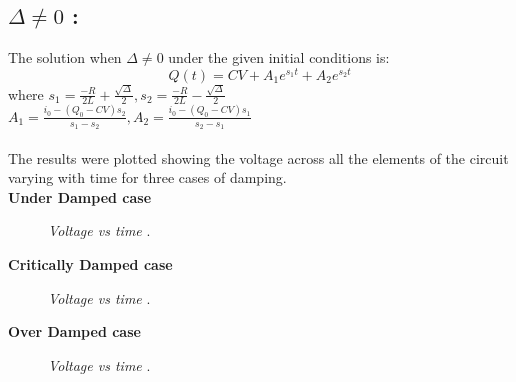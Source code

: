\documentclass[12pt, a4paper]{report}
\begin{document}
\subsection*{$\Delta \ne 0$ :}
The solution when $\Delta \ne 0$ under the given initial conditions is:
\begin{equation}
 Q(t) = CV + A_1e^{s_1t} + A_2e^{s_2t}
\end{equation}
where $s_1 = \frac{-R}{2L} + \frac{\sqrt{\Delta}}{2} , s_2 = \frac{-R}{2L} - \frac{\sqrt{\Delta}}{2}$ \\
$A_1 = \frac{i_0 - (Q_0 - CV)s_2}{s_1 - s_2} , A_2 = \frac{i_0 - (Q_0 - CV)s_1}{s_2 - s_1}$ \\
\\

The results were plotted showing the voltage across all the elements of the circuit varying with time for three cases of damping.\\

\textbf{Under Damped case}
\begin{figure}[H]
  \centering
  \caption[Voltage vs time]    
  {\textit{Voltage vs time}
  \label{Fig:1}
  \footnotemark.}
\end{figure}
\pagebreak
\textbf{Critically Damped case}
\begin{figure}[H]
  \centering
  \caption[Voltage vs time]    
  {\textit{Voltage vs time}
  \label{Fig:2}
  \footnotemark.}
\end{figure}
\textbf{Over Damped case}
\begin{figure}[H]
  \centering
  \caption[Voltage vs time]    
  {\textit{Voltage vs time}
  \label{Fig:2}
  \footnotemark.}
\end{figure}
\end{document}
